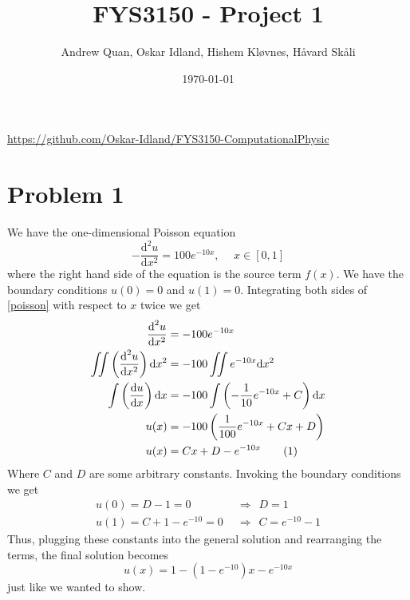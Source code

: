 \documentclass[english,notitlepage]{revtex4-1}  %
\newcommand{\imp}{\hspace{5pt}\Rightarrow\hspace{5pt}}
\newcommand\numberthis{\addtocounter{equation}{1}\tag{\theequation}}
\begin{document}
\title{\textbf{FYS3150 - Project 1}}
\author{Andrew Quan, Oskar Idland, Hishem Kløvnes, Håvard Skåli}
\date{\today}                             %
\noaffiliation      




\maketitle 
    
\href{https://github.com/Oskar-Idland/FYS3150-ComputationalPhysic}{https://github.com/Oskar-Idland/FYS3150-ComputationalPhysic}%
    
\section*{Problem 1}
We have the one-dimensional Poisson equation
\begin{equation}
    -\frac{\text{d}^2 u}{\text{d}x^2} = 100e^{-10x}, \hspace{15pt} x \in [0,1] \label{poisson}
\end{equation}
where the right hand side of the equation is the source term $f(x)$. We have the boundary conditions $u(0) = 0$ and $u(1) = 0$. Integrating both sides of \cref{poisson} with respect to $x$ twice we get
\begin{align*}
    \frac{\text{d}^2 u}{\text{d}x^2} &= -100e^{-10x} \\
    \iint \left( \frac{\text{d}^2 u}{\text{d}x^2} \right) \text{d}x^2 &= -100\iint e^{-10x} \text{d}x^2 \\
    \int \left( \frac{\text{d}u}{\text{d}x}\right) \text{d}x &= -100\int \left(-\frac{1}{10}e^{-10x} + C\right)\text{d}x \\
    u(x) &= -100\left(\frac{1}{100}e^{-10x} + Cx + D\right) \\
    u(x) &= Cx + D - e^{-10x} \numberthis \label{general sol}
\end{align*}
Where $C$ and $D$ are some arbitrary constants. Invoking the boundary conditions we get
\begin{align*}
    u(0) = D - 1 = 0 &\imp D = 1 \\
    u(1) = C + 1 - e^{-10} = 0 &\imp C = e^{-10} - 1
\end{align*}
Thus, plugging these constants into the general solution and rearranging the terms, the final solution becomes
\begin{equation}
    u(x) = 1 - \left(1 - e^{-10}\right)x - e^{-10x} \label{final sol}
\end{equation}
just like we wanted to show.
\end{document}
